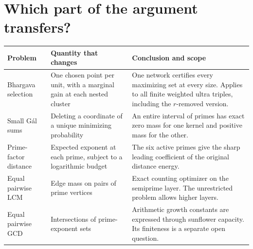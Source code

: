 \documentclass[11pt,a4paper]{article}
\begin{document}
\section*{Which part of the argument transfers?}
\begin{center}\small
\begin{tabular}{@{}>{\raggedright\arraybackslash}p{.25\linewidth}>{\raggedright\arraybackslash}p{.29\linewidth}>{\raggedright\arraybackslash}p{.38\linewidth}@{}}
\toprule
Problem & Quantity that changes & Conclusion and scope\\\midrule
Bhargava selection & One chosen point per unit, with a marginal gain at each nested cluster & One network certifies every maximizing set at every size. Applies to all finite weighted ultra triples, including the $r$-removed version.\\[3pt]
Small Gál sums & Deleting a coordinate of a unique minimizing probability & An entire interval of primes has exact zero mass for one kernel and positive mass for the other.\\[3pt]
Prime-factor distance & Expected exponent at each prime, subject to a logarithmic budget & The six active primes give the sharp leading coefficient of the original distance energy.\\[3pt]
Equal pairwise LCM & Edge mass on pairs of prime vertices & Exact counting optimizer on the semiprime layer. The unrestricted problem allows higher layers.\\[3pt]
Equal pairwise GCD & Intersections of prime-exponent sets & Arithmetic growth constants are expressed through sunflower capacity. Its finiteness is a separate open question.\\
\bottomrule
\end{tabular}
\end{center}
\clearpage
\end{document}
